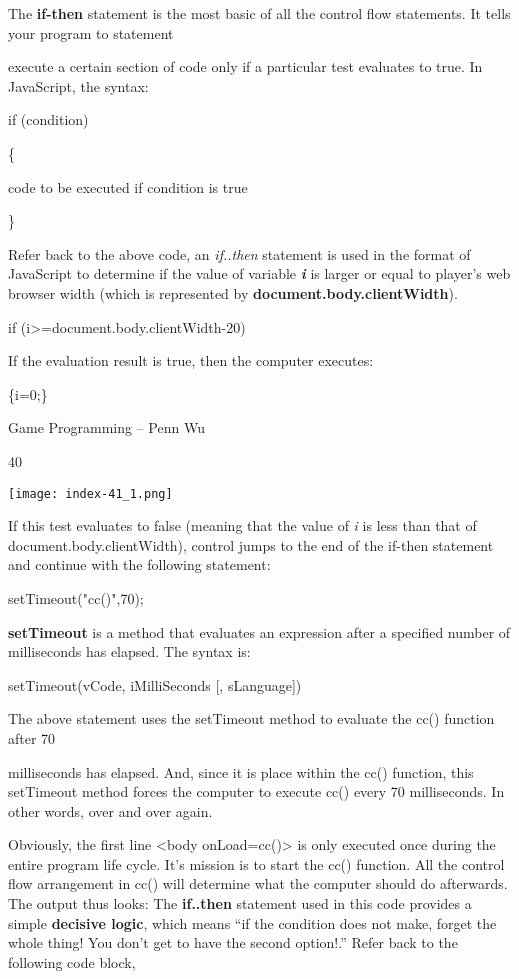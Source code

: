 \documentclass[
]{article}
\begin{document}
The \textbf{if-then} statement is the most basic of all the control flow
statements. It tells your program to statement

execute a certain section of code only if a particular test evaluates to
true. In JavaScript, the syntax:

if (condition)

\{

code to be executed if condition is true

\}

Refer back to the above code, an \emph{if..then} statement is used in
the format of JavaScript to determine if the value of variable
\emph{\textbf{i}} is larger or equal to player's web browser width
(which is represented by \textbf{document.body.clientWidth}).

if (i\textgreater=document.body.clientWidth-20)

If the evaluation result is true, then the computer executes:

\{i=0;\}

Game Programming -- Penn Wu

40

\protect\hypertarget{index_split_004.htmlux5cux23p41}{}{}\texttt{[image: index-41\_1.png]}

If this test evaluates to false (meaning that the value of \emph{i} is
less than that of document.body.clientWidth), control jumps to the end
of the if-then statement and continue with the following statement:

setTimeout("cc()",70);

\textbf{setTimeout} is a method that evaluates an expression after a
specified number of milliseconds has elapsed. The syntax is:

setTimeout(vCode, iMilliSeconds {[}, sLanguage{]})

The above statement uses the setTimeout method to evaluate the cc()
function after 70

milliseconds has elapsed. And, since it is place within the cc()
function, this setTimeout method forces the computer to execute cc()
every 70 milliseconds. In other words, over and over again.

Obviously, the first line \textless body onLoad=cc()\textgreater{} is
only executed once during the entire program life cycle. It's mission is
to start the cc() function. All the control flow arrangement in cc()
will determine what the computer should do afterwards. The output thus
looks: The \textbf{if..then} statement used in this code provides a
simple \textbf{decisive logic}, which means ``if the condition does not
make, forget the whole thing! You don't get to have the second
option!.'' Refer back to the following code block,
\end{document}

